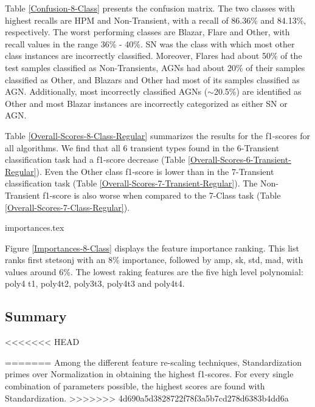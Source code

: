 \documentclass[a4paper,fleqn,usenatbib]{mnras}
\begin{document}
Table \ref{Confusion-8-Class} presents the confusion matrix.
The two classes with highest recalls are HPM and Non-Transient, with a
recall of 86.36\% and 84.13\%, respectively. 
The worst performing classes are Blazar, Flare and Other, with recall
values in the range 36\% - 40\%. 
SN was the class with which most other class instances are
incorrectly classified. 
Moreover, Flares had about 50\% of the test samples classified as
Non-Transients, AGNs had about 20\% of their 
samples classified as Other, and Blazars and Other had most of  its
samples classified as AGN. 
Additionally, most incorrectly classified AGNs ($\sim$20.5\%) are
identified as Other and most Blazar instances are
incorrectly categorized as either SN or AGN. 

Table \ref{Overall-Scores-8-Class-Regular} summarizes the results
for the f1-scores for all algorithms. 
We find that all 6 transient types found in the
6-Transient classification task had a f1-score decrease (Table
\ref{Overall-Scores-6-Transient-Regular}). 
Even the Other class f1-score is lower than in the 7-Transient classification task (Table
\ref{Overall-Scores-7-Transient-Regular}).
The Non-Transient f1-score is also worse when compared to the 7-Class
task (Table \ref{Overall-Scores-7-Class-Regular}).  


{importances.tex}

Figure \ref{Importances-8-Class} displays the feature importance ranking.
This list ranks first stetson\textunderscore j with an 8\% importance,
followed by amp, sk, std, mad, with values around 6\%. 
The lowest raking features are the five high level polynomial: poly4\textunderscore
t1,  poly4\textunderscore t2, poly3\textunderscore t3,
poly4\textunderscore t3 and poly4\textunderscore t4. 


\subsection{Summary}

<<<<<<< HEAD

=======
Among the different feature re-scaling techniques, Standardization
primes over Normalization in obtaining the highest f1-scores. 
For every single combination of parameters possible, the highest
scores are found with Standardization. 
>>>>>>> 4d690a5d3828722f78f3a5b7cd278d6383b4dd6a
\end{document}
